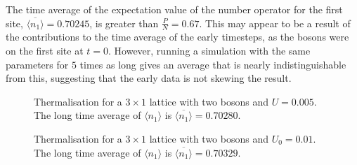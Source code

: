 \documentclass[prb, twocolumn, final]{revtex4-1}
\theoremstyle{plain}
\begin{document}
The time average of the expectation value of the number operator for the first
site, $\overline{\langle n_{1} \rangle} = 0.70245$, is greater than $\frac{P}{N}
= 0.67$. This may appear to be a result of the contributions to the time average
of the early timesteps, as the bosons were on the first site at $t=0$. However,
running a simulation with the same parameters for $5$ times as long gives an
average that is nearly indistinguishable from this, suggesting that the early
data is not skewing the result.
\begin{figure}[H]
     \caption{Thermalisation for a $3\times 1$ lattice with two bosons and $U =
              0.005$. The long time average of $\langle n_1 \rangle$ is
              $\overline{\langle n_1 \rangle}=0.70280.$}
\end{figure}

\begin{figure}[H]
     \caption{Thermalisation for a $3\times 1$ lattice with two bosons and
              $U_{0} = 0.01$. The long time average of $\langle n_1 \rangle$ is
              $\overline{\langle n_1 \rangle}=0.70329.$}
\end{figure}
\end{document}
